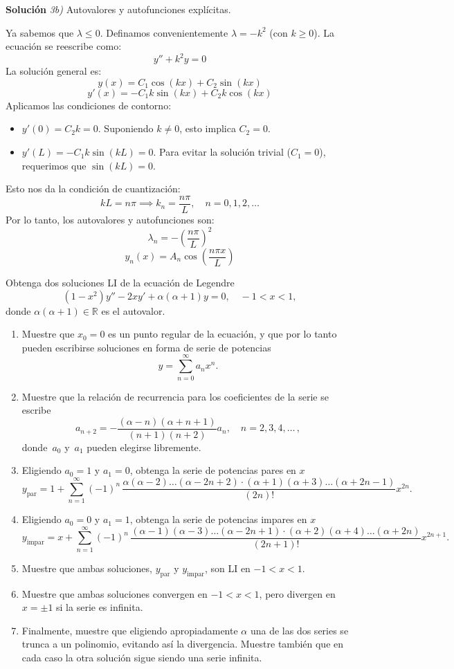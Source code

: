 \documentclass[11pt,spanish]{article}
\newcommand{\sca}[1]{\mathbb{#1}}
\newcounter{problema}
\newcommand{\prob}{\stepcounter{problema} \vspace{.5cm} \noindent{\bf Problema \arabic{problema}: }}
\begin{document}
\vspace{0.5cm}
{\bf Soluci\'on }{\em 3b)}
Autovalores y autofunciones explícitas.
\vspace{0.5cm}

Ya sabemos que $\lambda \le 0$. Definamos convenientemente $\lambda = -k^2$ (con $k \ge 0$). La ecuación se reescribe como:
$$y'' + k^2 y = 0$$
La solución general es:
$$y(x) = C_1 \cos(kx) + C_2 \sin(kx)$$
$$y'(x) = -C_1 k \sin(kx) + C_2 k \cos(kx)$$
Aplicamos las condiciones de contorno:
\begin{itemize}
\item $y'(0) = C_2 k = 0$. Suponiendo $k \neq 0$, esto implica $C_2 = 0$.
\item $y'(L) = -C_1 k \sin(kL) = 0$. Para evitar la solución trivial ($C_1 = 0$), requerimos que $\sin(kL) = 0$.
\end{itemize}
Esto nos da la condición de cuantización:
$$kL = n\pi \implies k_n = \frac{n\pi}{L}, \quad n=0, 1, 2, \dots$$
Por lo tanto, los autovalores y autofunciones son:
$$\lambda_n = -\left(\frac{n\pi}{L}\right)^2$$
$$y_n(x) = A_n \cos\left(\frac{n\pi x}{L}\right)$$



\prob Obtenga dos soluciones LI de la ecuación de Legendre
\[
(1-x^2)y'' - 2xy' + \alpha(\alpha+1)y = 0, \quad -1<x<1,
\]
donde $\alpha(\alpha+1)\in\sca{R}$ es el autovalor.
\begin{enumerate}
\item Muestre que $x_0=0$ es un punto regular de la ecuaci\'on, y que por lo tanto pueden escribirse soluciones en forma de serie de potencias
\[
y = \sum_{n=0}^{\infty} a_n x^{n}.
\]
\item Muestre que la relaci\'on de recurrencia para los coeficientes de la serie se escribe
\[
a_{n+2} = -\frac{(\alpha-n)(\alpha+n+1)}{(n+1)(n+2)}a_n, \quad n=2,3,4,\ldots\,,
\]
donde~$a_0$ y~$a_1$ pueden elegirse libremente.
\item Eligiendo $a_0=1$ y  $a_1=0$, obtenga la serie de potencias pares en $x$
\[
y_{\text{par}} = 1 + \sum_{n=1}^\infty
    (-1)^n\,\frac{\alpha(\alpha-2)\dots(\alpha-2n+2)\cdot 
                  (\alpha+1)(\alpha+3)\dots(\alpha+2n-1)}{(2n)!} x^{2n}.
\]
\item Eligiendo $a_0=0$ y  $a_1=1$, obtenga la serie de potencias impares en $x$
\[
y_{\text{impar}} =  x + \sum_{n=1}^\infty
    (-1)^n\,\frac{(\alpha-1)(\alpha-3)\dots(\alpha-2n+1)\cdot
                  (\alpha+2)(\alpha+4)\dots(\alpha+2n)}{(2n+1)!} x^{2n+1}.
\]
\item Muestre que ambas soluciones, $y_{\text{par}}$ y $y_{\text{impar}}$, son LI en $-1<x<1$.
\item Muestre que ambas soluciones convergen en $-1<x<1$, pero divergen en $x = \pm 1$ si la serie es infinita.
\item Finalmente, muestre que eligiendo apropiadamente $\alpha$ una de las dos series se trunca a un polinomio, evitando así la divergencia. Muestre tambi\'en que en cada caso la otra soluci\'on sigue siendo una serie infinita.
\end{enumerate}
\end{document}
